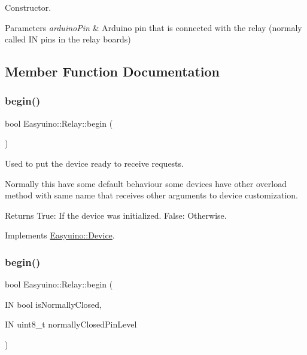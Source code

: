 Constructor. 


\begin{DoxyParams}{Parameters}
{\em arduino\+Pin} & Arduino pin that is connected with the relay (normaly called IN pins in the relay boards) \\
\hline
\end{DoxyParams}


\subsection{Member Function Documentation}
\mbox{\label{class_easyuino_1_1_relay_a920a0fa287cacfd8c6df19d8812d4958}} 
\subsubsection{\texorpdfstring{begin()}{begin()}\hspace{0.1cm}{\footnotesize\ttfamily [1/2]}}
{\footnotesize\ttfamily bool Easyuino\+::\+Relay\+::begin (\begin{DoxyParamCaption}{ }\end{DoxyParamCaption})\hspace{0.3cm}{\ttfamily [virtual]}}



Used to put the device ready to receive requests. 

Normally this have some default behaviour some devices have other overload method with same name that receives other arguments to device customization. \begin{DoxyReturn}{Returns}
True\+: If the device was initialized. False\+: Otherwise. 
\end{DoxyReturn}


Implements \hyperlink{class_easyuino_1_1_device_a2e7bb2fec849719a9d9432b57cdb72ba}{Easyuino\+::\+Device}.

\mbox{\label{class_easyuino_1_1_relay_a05e66468ee1b991f394d9182b9886bf7}} 
\subsubsection{\texorpdfstring{begin()}{begin()}\hspace{0.1cm}{\footnotesize\ttfamily [2/2]}}
{\footnotesize\ttfamily bool Easyuino\+::\+Relay\+::begin (\begin{DoxyParamCaption}\item[{IN bool}]{is\+Normally\+Closed,  }\item[{IN uint8\+\_\+t}]{normally\+Closed\+Pin\+Level }\end{DoxyParamCaption})}



